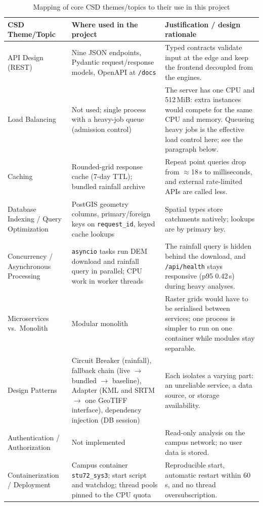 \documentclass[manuscript,screen,review]{acmart}
\begin{document}
\begin{table}[t]
  \caption{Mapping of core CSD themes/topics to their use in this project}
  \label{tab:csd-themes}
  \begin{tabular}{p{2.8cm}p{5.2cm}p{6.5cm}}
    \toprule
    CSD Theme/Topic & Where used in the project & Justification / design rationale \\
    \midrule
    API Design (REST) & Nine JSON endpoints, Pydantic request/response models, OpenAPI at \texttt{/docs} & Typed contracts validate input at the edge and keep the frontend decoupled from the engines. \\
    Load Balancing & Not used; single process with a heavy-job queue (admission control) & The server has one CPU and 512\,MiB: extra instances would compete for the same CPU and memory. Queueing heavy jobs is the effective load control here; see the paragraph below. \\
    Caching & Rounded-grid response cache (7-day TTL); bundled rainfall archive & Repeat point queries drop from $\approx$18\,s to milliseconds, and external rate-limited APIs are called less. \\
    Database Indexing / Query Optimization & PostGIS geometry columns, primary/foreign keys on \texttt{request\_id}, keyed cache lookups & Spatial types store catchments natively; lookups are by primary key. \\
    Concurrency / Asynchronous Processing & \texttt{asyncio} tasks run DEM download and rainfall query in parallel; CPU work in worker threads & The rainfall query is hidden behind the download, and \texttt{/api/health} stays responsive (p95 0.42\,s) during heavy analyses. \\
    Microservices vs.\ Monolith & Modular monolith & Raster grids would have to be serialised between services; one process is simpler to run on one container while modules stay separable. \\
    Design Patterns & Circuit Breaker (rainfall), fallback chain (live $\to$ bundled $\to$ baseline), Adapter (KML and SRTM $\to$ one GeoTIFF interface), dependency injection (DB session) & Each isolates a varying part: an unreliable service, a data source, or storage availability. \\
    Authentication / Authorization & Not implemented & Read-only analysis on the campus network; no user data is stored. \\
    Containerization / Deployment & Campus container \texttt{stu72\_sys3}; start script and watchdog; thread pools pinned to the CPU quota & Reproducible start, automatic restart within 60\,s, and no thread oversubscription. \\

\end{tabular}
\end{table}
\end{document}
